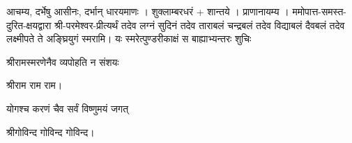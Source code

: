 


आचम्य, दर्भेषु आसीनः, दर्भान् धारयमाणः । शुक्लाम्बरधरं + शान्तये । प्राणानायम्य । 
    ममोपात्त-समस्त-दुरित-क्षयद्वारा श्री-परमेश्वर-प्रीत्यर्थं   तदेव लग्नं सुदिनं तदेव ताराबलं चन्द्रबलं तदेव विद्याबलं दैवबलं तदेव लक्ष्मीपते ते अङ्घ्रियुगं स्मरामि।
    {यः स्मरेत्पुण्डरीकाक्षं स बाह्याभ्यन्तरः शुचिः}

{श्रीरामस्मरणेनैव व्यपोहति न संशयः }

श्रीराम राम राम। 

{योगश्च करणं चैव सर्वं विष्णुमयं जगत्}

श्रीगोविन्द गोविन्द गोविन्द। 

